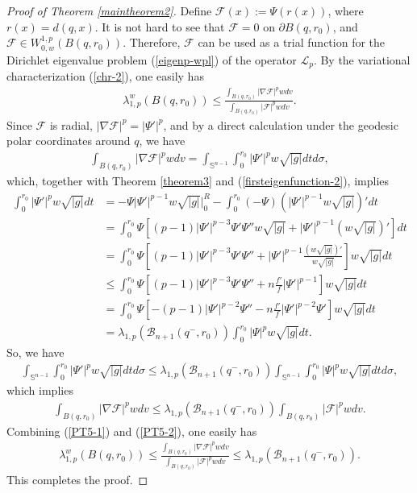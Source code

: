 \documentclass[12pt]{article}
\begin{document}
\begin{proof} [Proof of Theorem \ref{maintheorem2}]
Define $\mathcal {F}(x):=\Psi(r(x))$, where  $r(x)=d(q,x)$. It is
not hard to see that $\mathcal {F}= 0$ on $\partial B(q, r_0)$, and
$\mathcal {F}\in W^{1,p}_{0,w}(B(q,r_0))$. Therefore, $\mathcal{F}$
can be used as a trial function for the Dirichlet eigenvalue problem
(\ref{eigenp-wpl}) of the operator $\mathcal{L}_{p}$. By the
variational characterization (\ref{chr-2}), one easily has
 \begin{eqnarray} \label{PT5-1}
\lambda_{1,p}^{w}(B(q, r_0))\leq \frac{\int_{B(q, r_0)}|\nabla
\mathcal{F}|^{p}wdv}{\int_{B(q, r_0)}|\mathcal{F}|^{p}wdv}.
 \end{eqnarray}
Since $\mathcal{F}$ is radial, $|\nabla\mathcal{F}|^p=|\Psi'|^p$,
and by a direct calculation under the geodesic polar coordinates
around $q$, we have
 \begin{eqnarray*}
\int_{B(q, r_0)}|\nabla
\mathcal{F}|^{p}wdv=\int_{\mathbb{S}^{n-1}}\int^{r_0}_{0}|\Psi'|^{p}w\sqrt{|g|}dtd\sigma,
 \end{eqnarray*}
which, together with Theorem \ref{theorem3} and
(\ref{firsteigenfunction-2}), implies
\begin{equation*}
\begin{aligned}
\int^{r_0}_{0}|\Psi'|^{p}w\sqrt{|g|}dt
&=-\Psi|\Psi'|^{p-1}w\sqrt{|g|}\Big|^{R}_{0}-\int^{r_0}_{0}(-\Psi)(|\Psi'|^{p-1}w\sqrt{|g|})'dt  \\
&=\int^{r_0}_{0}\Psi\left[(p-1)|\Psi'|^{p-3}\Psi'\Psi''w\sqrt{|g|}+|\Psi'|^{p-1}(w\sqrt{|g|})'\right]dt  \\
&=\int^{r_0}_{0}\Psi\left[(p-1)|\Psi'|^{p-3}\Psi'\Psi''+|\Psi'|^{p-1}\frac{(w\sqrt{|g|})'}{w\sqrt{|g|}}\right]w\sqrt{|g|}dt   \\
&\leq \int^{r_0}_{0}\Psi\left[(p-1)|\Psi'|^{p-3}\Psi'\Psi''+n\frac{f'}{f}|\Psi'|^{p-1}\right]w\sqrt{|g|}dt  \\
&=\int^{r_0}_{0}\Psi\left[-(p-1)|\Psi'|^{p-2}\Psi''-n\frac{f'}{f}|\Psi'|^{p-2}\Psi'\right]w\sqrt{|g|}dt  \\
&=\lambda_{1,p}\left(\mathscr{B}_{n+1}(q^{-},r_0)\right)\int^{r_0}_{0}|\Psi|^{p}w\sqrt{|g|}dt.
\end{aligned}
\end{equation*}
So, we have
\begin{eqnarray*}
\int_{\mathbb{S}^{n-1}}\int^{r_0}_{0}|\Psi'|^{p}w\sqrt{|g|}dtd\sigma\leq\lambda_{1,p}\left(\mathscr{B}_{n+1}(q^{-},r_0)\right)\int_{\mathbb{S}^{n-1}}\int^{r_0}_{0}|\Psi|^{p}w\sqrt{|g|}dtd\sigma,
\end{eqnarray*}
which implies
\begin{eqnarray} \label{PT5-2}
\int_{B(q, r_0)}|\nabla
\mathcal{F}|^{p}wdv\leq\lambda_{1,p}\left(\mathscr{B}_{n+1}(q^{-},r_0)\right)\int_{B(q,
r_0)}|\mathcal{F}|^{p}wdv.
\end{eqnarray}
Combining (\ref{PT5-1}) and  (\ref{PT5-2}), one easily has
\begin{eqnarray*}
\lambda_{1,p}^{w}(B(q, r_0))\leq \frac{\int_{B(q, r_0)}|\nabla
\mathcal{F}|^{p}wdv}{\int_{B(q,
r_0)}|\mathcal{F}|^{p}wdv}\leq\lambda_{1,p}\left(\mathscr{B}_{n+1}(q^{-},r_0)\right).
\end{eqnarray*}
This completes the proof.
\end{proof}
\end{document}
